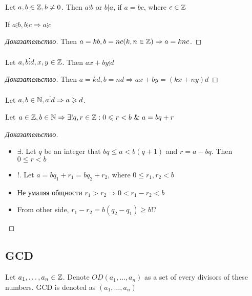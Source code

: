\begin{definition}[]
	Let $a,b \in \mathbb{Z}, b \neq 0$. Then $a \vdots b$ or $b | a$, if  $a = bc$, where  $c \in \mathbb{Z}$
\end{definition}

\begin{property}[]
	If $a \vdots b, b \vdots c \Rightarrow a \vdots c$
\end{property}

\begin{proof}[Доказательство]
	Then $a = kb, b = nc (k,n \in \mathbb{Z}) \Rightarrow a = knc$.
\end{proof}

\begin{property}[]
	Let $a,b \vdots d, x,y \in \mathbb{Z}$. Then $ax + by \vdots d$
\end{property}

\begin{proof}[Доказательство]
	Then $a = kd, b = nd \Rightarrow ax + by = (kx + ny)d$
\end{proof}

\begin{property}[]
	Let $a,b \in \mathbb{N}, a \vdots d \Rightarrow a \geqslant d$.
\end{property}

\begin{theorem}[]
	Let $a \in \mathbb{Z}, b \in \mathbb{N} \Rightarrow \exists ! q,r \in \mathbb{Z}: 0 \leqslant r < b \ \& \ a = bq + r$
\end{theorem}

\begin{proof}[Доказательство]
	\begin{itemize}
		\item $\exists $. Let $q$ be an integer that $bq \leq a < b(q+1) $ and $r = a - bq$. Then  $0 \leq r < b$ 
		\item !. Let $a = bq_1 + r_1 = bq_2 + r_2$, where $0 \leq r_1, r_2 < b$ 
		\item Не умаляя общности $r_1 > r_2 \Rightarrow 0 < r_1 - r_2 < b$
		\item From other side, $r_1 - r_2 = b(q_2 - q_1) \geq b!?$
	\end{itemize}
\end{proof}

\subsection{GCD}

\begin{definition}[]
	Let $a_1, \dots , a_{n} \in \mathbb{Z}$. Denote $OD(a_1, \dots , a_{n})$ as a set of every divisors of these numbers. GCD is denoted as $(a_1, \dots , a_{n})$
\end{definition}

